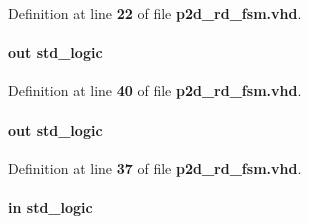 Definition at line {\bf 22} of file {\bf p2d\+\_\+rd\+\_\+fsm.\+vhd}.

\paragraph[{rd\+\_\+fsm\+\_\+rd\+\_\+hold}]{ {\bfseries \textcolor{keywordflow}{out}\textcolor{vhdlchar}{ }} {\bfseries \textcolor{comment}{std\+\_\+logic}\textcolor{vhdlchar}{ }} \hspace{0.3cm}{\ttfamily [Port]}}\label{classp2d__rd__fsm_a3b0a6e4b8942eeb34e8246815031baaa}


Definition at line {\bf 40} of file {\bf p2d\+\_\+rd\+\_\+fsm.\+vhd}.

\paragraph[{rd\+\_\+fsm\+\_\+rdy}]{ {\bfseries \textcolor{keywordflow}{out}\textcolor{vhdlchar}{ }} {\bfseries \textcolor{comment}{std\+\_\+logic}\textcolor{vhdlchar}{ }} \hspace{0.3cm}{\ttfamily [Port]}}\label{classp2d__rd__fsm_a644f71b55d9e62e55c3588d45d6b1d7a}


Definition at line {\bf 37} of file {\bf p2d\+\_\+rd\+\_\+fsm.\+vhd}.

\paragraph[{reset\+\_\+n}]{ {\bfseries \textcolor{keywordflow}{in}\textcolor{vhdlchar}{ }} {\bfseries \textcolor{comment}{std\+\_\+logic}\textcolor{vhdlchar}{ }} \hspace{0.3cm}{\ttfamily [Port]}}\label{classp2d__rd__fsm_a446ea52ed8c4a84181a47d9165ce41a5}


